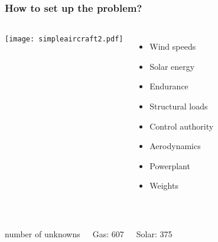 \documentclass{beamer}
\begin{document}
\begin{frame}
    \frametitle{How to set up the problem?}

    \pause 
    \begin{columns}
        \texttt{[image: simpleaircraft2.pdf]}
        
        \begin{itemize}
            \pause
            \item Wind speeds
            \pause
            \item Solar energy
            \pause
            \item Endurance
            \pause
            \item Structural loads
            \pause
            \item Control authority
            \pause
            \item Aerodynamics
            \pause
            \item Powerplant
            \pause
            \item Weights \\~\\
            \end{itemize}
    \end{columns}
    
    \pause
    \begin{columns}
    \begin{center}
       number of unknowns
    \end{center}
    \begin{columns}
        \begin{center}
        Gas: 607 
        \end{center}
        
        \begin{center}
        Solar: 375
        \end{center}
        
    \end{columns}
    \end{columns}

\end{frame}
\end{document}

